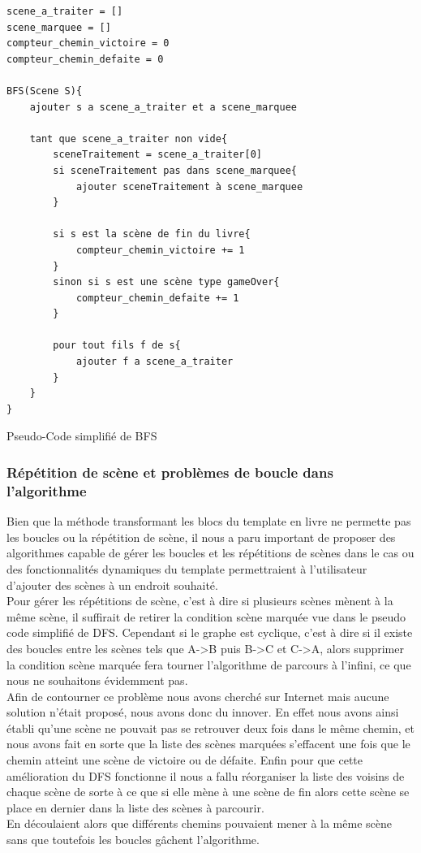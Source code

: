 \documentclass[12pt]{article}
\begin{document}
\begin{listing}[H]
\begin{verbatim}
scene_a_traiter = []
scene_marquee = []
compteur_chemin_victoire = 0
compteur_chemin_defaite = 0

BFS(Scene S){
    ajouter s a scene_a_traiter et a scene_marquee
    
    tant que scene_a_traiter non vide{
        sceneTraitement = scene_a_traiter[0]
        si sceneTraitement pas dans scene_marquee{
            ajouter sceneTraitement à scene_marquee
        }
        
        si s est la scène de fin du livre{
            compteur_chemin_victoire += 1
        }
        sinon si s est une scène type gameOver{
            compteur_chemin_defaite += 1
        }
        
        pour tout fils f de s{
            ajouter f a scene_a_traiter    
        }
    }
}
\end{verbatim}
\caption{Pseudo-Code simplifié de BFS}
\end{listing}

\subsubsection{Répétition de scène et problèmes de boucle dans l'algorithme}
Bien que la méthode transformant les blocs du template en livre ne permette pas les boucles ou la répétition de scène, il nous a paru important de proposer des algorithmes capable de gérer les boucles et les répétitions de scènes dans le cas ou des fonctionnalités dynamiques du template permettraient à l'utilisateur d'ajouter des scènes à un endroit souhaité.\\
Pour gérer les répétitions de scène, c'est à dire si plusieurs scènes mènent à la même scène, il suffirait de retirer la condition scène marquée vue dans le pseudo code simplifié de DFS. Cependant si le graphe est cyclique, c'est à dire si il existe des boucles entre les scènes tels que A->B puis B->C et C->A, alors supprimer la condition scène marquée fera tourner l'algorithme de parcours à l'infini, ce que nous ne souhaitons évidemment pas.\\
Afin de contourner ce problème nous avons cherché sur Internet mais aucune solution n'était proposé, nous avons donc du innover. En effet nous avons ainsi établi qu'une scène ne pouvait pas se retrouver deux fois dans le même chemin, et nous avons fait en sorte que la liste des scènes marquées s'effacent une fois que le chemin atteint une scène de victoire ou de défaite. Enfin pour que cette amélioration du DFS fonctionne il nous a fallu réorganiser la liste des voisins de chaque scène de sorte à ce que si elle mène à une scène de fin alors cette scène se place en dernier dans la liste des scènes à parcourir.\\
En découlaient alors que différents chemins pouvaient mener à la même scène sans que toutefois les boucles gâchent l'algorithme.
\end{document}
